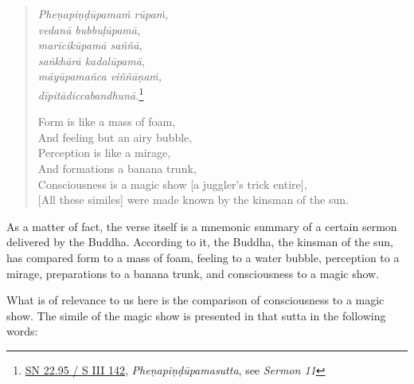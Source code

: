 \begin{quote}
\emph{Pheṇapiṇḍūpamaṁ rūpaṁ,}\\
\emph{vedanā bubbuḷūpamā,}\\
\emph{marīcikūpamā saññā,}\\
\emph{saṅkhārā kadalūpamā,}\\
\emph{māyūpamañca viññāṇaṁ,}\\
\emph{dīpitādiccabandhunā.}\footnote{\href{https://suttacentral.net/sn22.95/pli/ms}{SN 22.95 / S III 142}, \emph{Pheṇapiṇḍūpamasutta}, see \emph{Sermon 11}}

Form is like a mass of foam,\\
And feeling but an airy bubble,\\
Perception is like a mirage,\\
And formations a banana trunk,\\
Consciousness is a magic show [a juggler's trick entire],\\
{[}All these similes{]} were made known by the kinsman of the sun.
\end{quote}

As a matter of fact, the verse itself is a mnemonic summary of a certain sermon delivered by the Buddha. According to it, the Buddha, the kinsman of the sun, has compared form to a mass of foam, feeling to a water bubble, perception to a mirage, preparations to a banana trunk, and consciousness to a magic show.

What is of relevance to us here is the comparison of consciousness to a magic show. The simile of the magic show is presented in that sutta in the following words:

